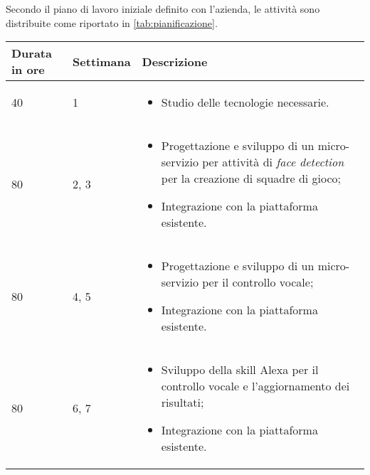 \noindent Secondo il piano di lavoro iniziale definito con l'azienda, le attività sono distribuite come riportato in
\autoref{tab:pianificazione}.

\begin{center}
	
	\renewcommand{\arraystretch}{1.5}
	
		\centering
		\begin{longtable}{| C{2.5cm} | C{2cm} | L{7.2cm} | }
			
			\hline
			
			\textbf{Durata in ore} & \textbf{Settimana} & \textbf{Descrizione} \\
			
			\hline
			
			40 & 1 &
			\begin{itemize}[leftmargin=*]
				\item Studio delle tecnologie necessarie.
			\end{itemize} \\
			
			\hline
			
			80 & 2, 3 &
			\begin{itemize}[leftmargin=*]
				\item Progettazione e sviluppo di un micro-servizio per attività di \emph{face detection} per 
				la creazione di squadre di gioco;
				\item Integrazione con la piattaforma esistente. 
			\end{itemize}  \\
			
			\hline
		
			
			80 & 4, 5 &
			\begin{itemize}[leftmargin=*]
				\item Progettazione e sviluppo di un micro-servizio per il controllo vocale;
				\item Integrazione con la piattaforma esistente. 
			\end{itemize}  \\
			 
			\hline
			
			80 & 6, 7 &
			\begin{itemize}[leftmargin=*]
				\item Sviluppo della \gls{skill} Alexa per il controllo vocale e l'aggiornamento dei risultati;
				\item Integrazione con la piattaforma esistente. 
			\end{itemize}  \\
			

\end{longtable}
\end{center}
